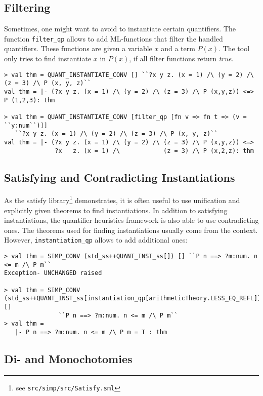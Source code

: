 \documentclass[a4paper,12pt,DIV=12,oneside]{scrbook}
\theoremstyle{definition}
\theoremstyle{remark}
\begin{document}
\subsection{Filtering}
Sometimes, one might want to avoid to instantiate certain quantifiers.
The function \texttt{filter\_qp} allows to add ML-functions that filter the handled
quantifiers. These functions are given a variable $x$ and a term $P(x)$.
The tool only tries to find instantiate $x$ in $P(x)$, if all filter functions
return \textit{true}.

{\scriptsize
\begin{verbatim}
> val thm = QUANT_INSTANTIATE_CONV [] ``?x y z. (x = 1) /\ (y = 2) /\ (z = 3) /\ P (x, y, z)``
val thm = |- (?x y z. (x = 1) /\ (y = 2) /\ (z = 3) /\ P (x,y,z)) <=> P (1,2,3): thm

> val thm = QUANT_INSTANTIATE_CONV [filter_qp [fn v => fn t => (v = ``y:num``)]]
   ``?x y z. (x = 1) /\ (y = 2) /\ (z = 3) /\ P (x, y, z)``
val thm = |- (?x y z. (x = 1) /\ (y = 2) /\ (z = 3) /\ P (x,y,z)) <=>
              ?x   z. (x = 1) /\            (z = 3) /\ P (x,2,z): thm
\end{verbatim}}

\subsection{Satisfying and Contradicting Instantiations}

As the satisfy library\footnote{see \texttt{src/simp/src/Satisfy.sml}} demonstrates, it is often
useful to use unification and explicitly given theorems to
find instantiations. In addition to satisfying instantiations, the quantifier heuristics framework
is also able to use contradicting ones. The theorems used for finding instantiations usually come from
the context. However, \texttt{instantiation\_qp} allows to add additional ones:

{\scriptsize
\begin{verbatim}
> val thm = SIMP_CONV (std_ss++QUANT_INST_ss[]) [] ``P n ==> ?m:num. n <= m /\ P m``
Exception- UNCHANGED raised

> val thm = SIMP_CONV (std_ss++QUANT_INST_ss[instantiation_qp[arithmeticTheory.LESS_EQ_REFL]]) []
               ``P n ==> ?m:num. n <= m /\ P m``
> val thm =
   |- P n ==> ?m:num. n <= m /\ P m = T : thm
\end{verbatim}}

\subsection{Di- and Monochotomies}
\end{document}
